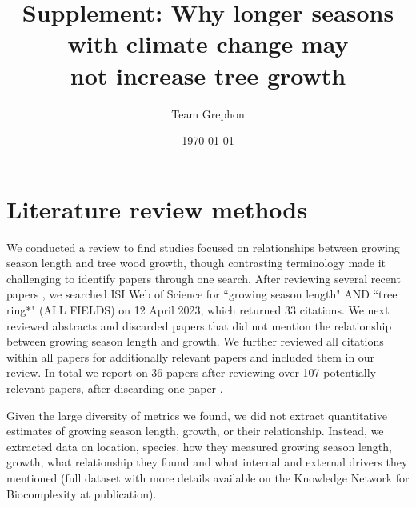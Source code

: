 \documentclass[11pt]{article}
\begin{document}
\renewcommand{\refname}{\CHead{}}


\title{Supplement: Why longer seasons with climate change may\\ not increase tree growth}
\author{Team Grephon}
\date{\today}
\maketitle

\renewcommand{\thetable}{S\arabic{table}}
\renewcommand{\thefigure}{S\arabic{figure}}


\section*{Literature review methods}

We conducted a review to find studies focused on relationships between growing season length and tree wood growth, though contrasting terminology made it challenging to identify papers through one search. After reviewing several recent papers \citep{dow2022warm,zohner2023effect}, we searched ISI Web of Science for ``growing season length" AND ``tree ring*" (ALL FIELDS) on 12 April 2023, which returned 33 citations. We next reviewed abstracts and discarded papers that did not mention the relationship between growing season length and growth. We further reviewed all citations within all papers for additionally relevant papers and included them in our review. In total we report on 36 papers after reviewing over 107 potentially relevant papers, after discarding one paper \citep[][which used tree lines as a metric of both growth and growing season length]{bruening2017}. %

Given the large diversity of metrics we found, we did not extract quantitative estimates of growing season length, growth, or their relationship. Instead, we extracted data on location, species, how they measured growing season length, growth, what relationship they found and what internal and external drivers they mentioned (full dataset with more details available on the Knowledge Network for Biocomplexity at publication).
\end{document}
